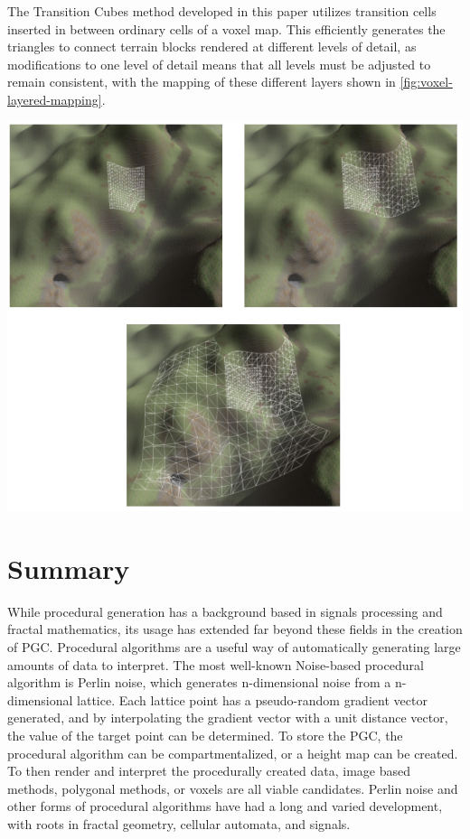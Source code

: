 \documentclass[10pt]{report}
\begin{document}
		The Transition Cubes method developed in this paper utilizes transition cells inserted in between ordinary cells of a voxel map. This efficiently generates the triangles to connect terrain blocks rendered at different levels of detail, as modifications to one level of detail means that all levels must be adjusted to remain consistent, with the mapping of these different layers shown in \autoref{fig:voxel-layered-mapping}.
		
		\begin{minipage}{\textwidth}
			\centering
			\includegraphics[scale=.75]{voxel-detail}
			\label{fig:voxel-layered-mapping}
		\end{minipage}
			
	\vspace{10pt}
	\let\clearpage\relax
	\chapter{Summary}
		
		While procedural generation has a background based in signals processing and fractal mathematics, its usage has extended far beyond these fields in the creation of PGC. Procedural algorithms are a useful way of automatically generating large amounts of data to interpret. The most well-known Noise-based procedural algorithm is Perlin noise, which generates n-dimensional noise from a n-dimensional lattice. Each lattice point has a pseudo-random gradient vector generated, and by interpolating the gradient vector with a unit distance vector, the value of the target point can be determined. To store the PGC, the procedural algorithm can be compartmentalized, or a height map can be created. To then render and interpret the procedurally created data, image based methods, polygonal methods, or voxels are all viable candidates. Perlin noise and other forms of procedural algorithms have had a long and varied development, with roots in fractal geometry, cellular automata, and signals. 
	
	\newpage
	\renewcommand{\bibname}{References}
	
		
\end{document}
